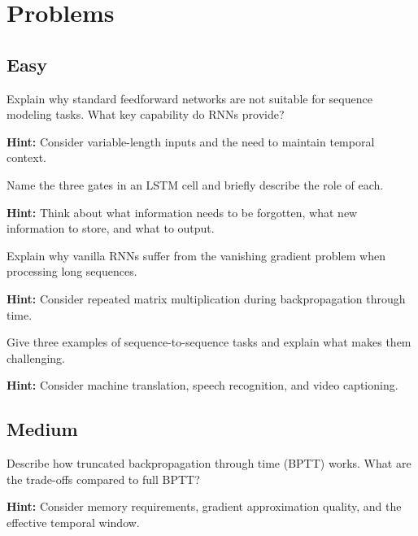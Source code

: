 
\section*{Problems}

\subsection*{Easy}

\begin{problem}
Explain why standard feedforward networks are not suitable for sequence modeling tasks. What key capability do RNNs provide?

\textbf{Hint:} Consider variable-length inputs and the need to maintain temporal context.
\end{problem}

\begin{problem}
Name the three gates in an LSTM cell and briefly describe the role of each.

\textbf{Hint:} Think about what information needs to be forgotten, what new information to store, and what to output.
\end{problem}

\begin{problem}
Explain why vanilla RNNs suffer from the vanishing gradient problem when processing long sequences.

\textbf{Hint:} Consider repeated matrix multiplication during backpropagation through time.
\end{problem}

\begin{problem}
Give three examples of sequence-to-sequence tasks and explain what makes them challenging.

\textbf{Hint:} Consider machine translation, speech recognition, and video captioning.
\end{problem}

\subsection*{Medium}

\begin{problem}
Describe how truncated backpropagation through time (BPTT) works. What are the trade-offs compared to full BPTT?

\textbf{Hint:} Consider memory requirements, gradient approximation quality, and the effective temporal window.
\end{problem}

